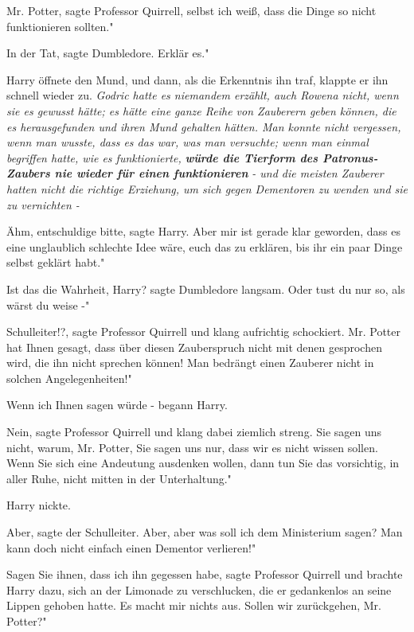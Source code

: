 \glqq{}Mr. Potter\grqq{}, sagte Professor Quirrell, \glqq{}selbst ich weiß, dass
die Dinge so nicht funktionieren sollten."

\glqq{}In der Tat\grqq{}, sagte Dumbledore. \glqq{}Erklär es."

Harry öffnete den Mund, und dann, als die Erkenntnis ihn traf, klappte er ihn
schnell wieder zu. \emph{ Godric hatte es niemandem erzählt, auch Rowena nicht,
wenn sie es gewusst hätte; es hätte eine ganze Reihe von Zauberern geben können,
die es herausgefunden und ihren Mund gehalten hätten. Man konnte nicht
vergessen, wenn man wusste, dass es das war, was man versuchte; wenn man einmal
begriffen hatte, wie es funktionierte,} \textbf{\emph{würde die Tierform des
Patronus-Zaubers nie wieder für einen funktionieren} }\emph{- und die meisten
Zauberer hatten nicht die richtige Erziehung, um sich gegen Dementoren zu wenden
und sie zu vernichten -}

\glqq{}Ähm, entschuldige bitte\grqq{}, sagte Harry. \glqq{}Aber mir ist gerade
klar geworden, dass es eine unglaublich schlechte Idee wäre, euch das zu
erklären, bis ihr ein paar Dinge selbst geklärt habt."

\glqq{}Ist das die Wahrheit, Harry?\grqq{} sagte Dumbledore langsam. \glqq{}Oder
tust du nur so, als wärst du weise -"

\glqq{}Schulleiter!?\grqq{}, sagte Professor Quirrell und klang aufrichtig
schockiert. \glqq{}Mr. Potter hat Ihnen gesagt, dass über diesen Zauberspruch
nicht mit denen gesprochen wird, die ihn nicht sprechen können! Man bedrängt
einen Zauberer nicht in solchen Angelegenheiten!"

\glqq{}Wenn ich Ihnen sagen würde -\grqq{} begann Harry.

\glqq{}Nein\grqq{}, sagte Professor Quirrell und klang dabei ziemlich streng.
\glqq{}Sie sagen uns nicht, warum, Mr. Potter, Sie sagen uns nur, dass wir es
nicht wissen sollen. Wenn Sie sich eine Andeutung ausdenken wollen, dann tun Sie
das vorsichtig, in aller Ruhe, nicht mitten in der Unterhaltung."

Harry nickte.

\glqq{}Aber\grqq{}, sagte der Schulleiter. \glqq{}Aber, aber was soll ich dem
Ministerium sagen? Man kann doch nicht einfach einen Dementor verlieren!"

\glqq{}Sagen Sie ihnen, dass ich ihn gegessen habe\grqq{}, sagte Professor
Quirrell und brachte Harry dazu, sich an der Limonade zu verschlucken, die er
gedankenlos an seine Lippen gehoben hatte. \glqq{}Es macht mir nichts aus. Sollen
wir zurückgehen, Mr. Potter?"

